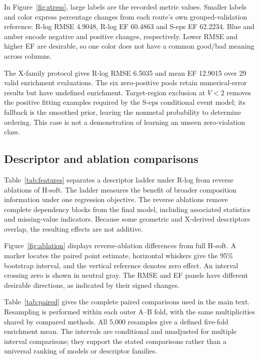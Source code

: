 In Figure~\ref{fig:stress}, large labels are the recorded metric values. Smaller labels and color express percentage changes from each route's own grouped-validation reference: R-log RMSE 4.9048, R-log EF 60.4863 and S-eps EF 62.2234. Blue and amber encode negative and positive changes, respectively. Lower RMSE and higher EF are desirable, so one color does not have a common good/bad meaning across columns.

The X-family protocol gives R-log RMSE 6.5035 and mean EF 12.9015 over 29 valid enrichment evaluations. The six zero-positive pools retain numerical-error results but have undefined enrichment. Target-region exclusion at $V<2$ removes the positive fitting examples required by the S-eps conditional event model; its fallback is the smoothed prior, leaving the nonmetal probability to determine ordering. This case is not a demonstration of learning an unseen zero-violation class.
\FloatBarrier

\subsection{Descriptor and ablation comparisons}
Table~\ref{tab:features} separates a descriptor ladder under R-log from reverse ablations of H-soft. The ladder measures the benefit of broader composition information under one regression objective. The reverse ablations remove complete dependency blocks from the final model, including associated statistics and missing-value indicators. Because some geometric and X-derived descriptors overlap, the resulting effects are not additive.


Figure~\ref{fig:ablation} displays reverse-ablation differences from full H-soft. A marker locates the paired point estimate, horizontal whiskers give the 95\% bootstrap interval, and the vertical reference denotes zero effect. An interval crossing zero is shown in neutral gray. The RMSE and EF panels have different desirable directions, as indicated by their signed changes.

Table~\ref{tab:paired} gives the complete paired comparisons used in the main text. Resampling is performed within each outer A--B fold, with the same multiplicities shared by compared methods. All 5,000 resamples give a defined five-fold enrichment mean. The intervals are conditional and unadjusted for multiple interval comparisons; they support the stated comparisons rather than a universal ranking of models or descriptor families.

\FloatBarrier
